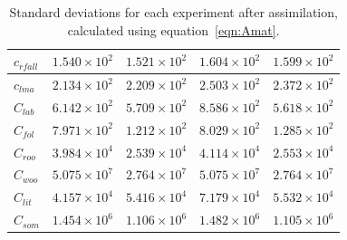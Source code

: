 \documentclass[review]{elsarticle}
\begin{document}
\begin{table}[ht]
\begin{center}
\begin{tabular}{| l | l | l | l | l |}
$c_{rfall}$ & $1.540\times 10^{2}$ & $1.521\times 10^{2}$ & $1.604\times 10^{2}$ & $1.599\times 10^{2}$ \\ \hline
$c_{lma}$ & $2.134\times 10^{2}$ & $2.209\times 10^{2}$ & $2.503\times 10^{2}$ & $2.372\times 10^{2}$ \\ \hline
$C_{lab}$ & $6.142\times 10^{2}$ & $5.709\times 10^{2}$ & $8.586\times 10^{2}$ & $5.618\times 10^{2}$ \\ \hline
$C_{fol}$ & $7.971\times 10^{2}$ & $1.212\times 10^{2}$ & $8.029\times 10^{2}$ & $1.285\times 10^{2}$ \\ \hline
$C_{roo}$ & $3.984\times 10^{4}$ & $2.539\times 10^{4}$ & $4.114\times 10^{4}$ & $2.553\times 10^{4}$ \\ \hline
$C_{woo}$ & $5.075\times 10^{7}$ & $2.764\times 10^{7}$ & $5.075\times 10^{7}$ & $2.764\times 10^{7}$ \\ \hline
$C_{lit}$ & $4.157\times 10^{4}$ & $5.416\times 10^{4}$ & $7.179\times 10^{4}$ & $5.532\times 10^{4}$ \\ \hline
$C_{som}$ & $1.454\times 10^{6}$ & $1.106\times 10^{6}$ & $1.482\times 10^{6}$ & $1.105\times 10^{6}$  \\ \hline
	\end{tabular}
	\caption{Standard deviations for each experiment after assimilation, calculated using equation~\ref{eqn:Amat}.}
	\label{table:expvars}
\end{center} 
\end{table}
\end{document}
